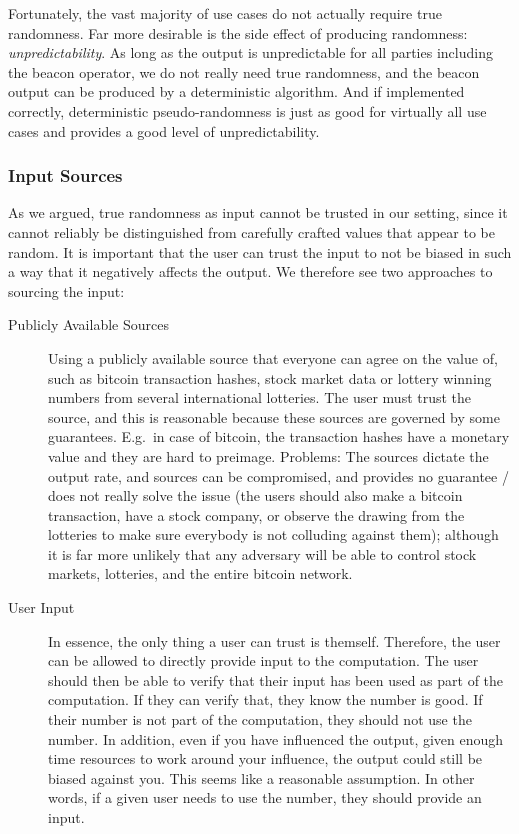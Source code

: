 Fortunately, the vast majority of use cases do not actually require true randomness.
Far more desirable is the side effect of producing randomness: \emph{unpredictability}.
As long as the output is unpredictable for all parties including the beacon operator, we do not really need true randomness, and the beacon output can be produced by a deterministic algorithm.
And if implemented correctly, deterministic pseudo-randomness is just as good for virtually all use cases and provides a good level of unpredictability.

\subsubsection{Input Sources}
As we argued, true randomness as input cannot be trusted in our setting, since it cannot reliably be distinguished from carefully crafted values that appear to be random.
It is important that the user can trust the input to not be biased in such a way that it negatively affects the output. We therefore see two approaches to sourcing the input:

\begin{description}
    \item[Publicly Available Sources] Using a publicly available source that everyone can agree on the value of, such as bitcoin transaction hashes, stock market data or lottery winning numbers from several international lotteries.
The user must trust the source, and this is reasonable because these sources are governed by some guarantees. E.g.\ in case of bitcoin, the transaction hashes have a monetary value and they are hard to preimage.
Problems: The sources dictate the output rate, and sources can be compromised, and provides no guarantee / does not really solve the issue (the users should also make a bitcoin transaction, have a stock company, or observe the drawing from the lotteries to make sure everybody is not colluding against them); although it is far more unlikely that any adversary will be able to control stock markets, lotteries, and the entire bitcoin network. 

    \item[User Input] In essence, the only thing a user can trust is themself.
Therefore, the user can be allowed to directly provide input to the computation.
The user should then be able to verify that their input has been used as part of the computation.
If they can verify that, they know the number is good.
If their number is not part of the computation, they should not use the number.
 In addition, even if you have influenced the output, given enough time resources to work around your influence, the output could still be biased against you.
This seems like a reasonable assumption.
In other words, if a given user needs to use the number, they should provide an input.

\end{description}

